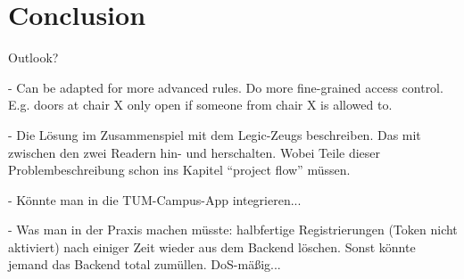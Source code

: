 \section{Conclusion}\label{sec:conclusion}


Outlook?

- Can be adapted for more advanced rules. Do more fine-grained access control. E.g. doors at chair X only open if someone from chair X is allowed to.

- Die Lösung im Zusammenspiel mit dem Legic-Zeugs beschreiben. Das mit zwischen den zwei Readern hin- und herschalten.
Wobei Teile dieser Problembeschreibung schon ins Kapitel ``project flow'' müssen.

- Könnte man in die TUM-Campus-App integrieren...

- Was man in der Praxis machen müsste: halbfertige Registrierungen (Token nicht aktiviert) nach einiger Zeit wieder aus dem Backend löschen. Sonst könnte jemand das Backend total zumüllen. DoS-mäßig...